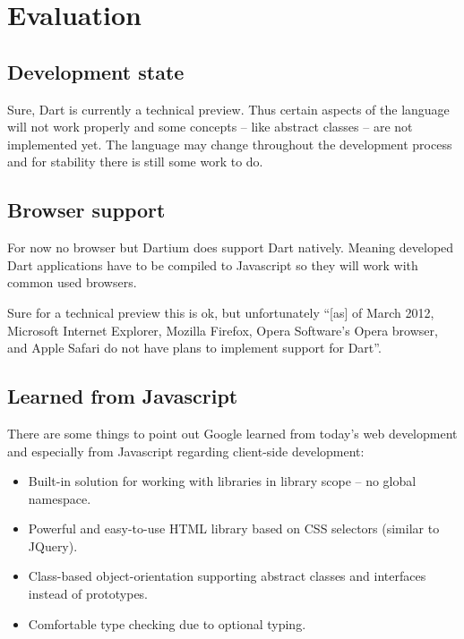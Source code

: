 \section{Evaluation}
\label{section:evaluation}

\subsection{Development state}

Sure, Dart is currently a technical preview. Thus certain aspects of the language will not work properly and some concepts -- like abstract classes -- are not implemented yet. The language may change throughout the development process and for stability there is still some work to do.

\subsection{Browser support}

For now no browser but Dartium does support Dart natively. Meaning developed Dart applications have to be compiled to Javascript so they will work with common used browsers.

Sure for a technical preview this is ok, but unfortunately ``[as] of March 2012, Microsoft Internet Explorer, Mozilla Firefox, Opera Software's Opera browser, and Apple Safari do not have plans to implement support for Dart''.\cite{Wikipedia}

\subsection{Learned from Javascript}

There are some things to point out Google learned from today's web development and especially from Javascript regarding client-side development:\cite{t3n}

\begin{itemize}
\item Built-in solution for working with libraries in library scope -- no global namespace.
\item Powerful and easy-to-use HTML library based on CSS selectors (similar to JQuery).
\item Class-based object-orientation supporting abstract classes and interfaces instead of prototypes.
\item Comfortable type checking due to optional typing.
\end{itemize}
